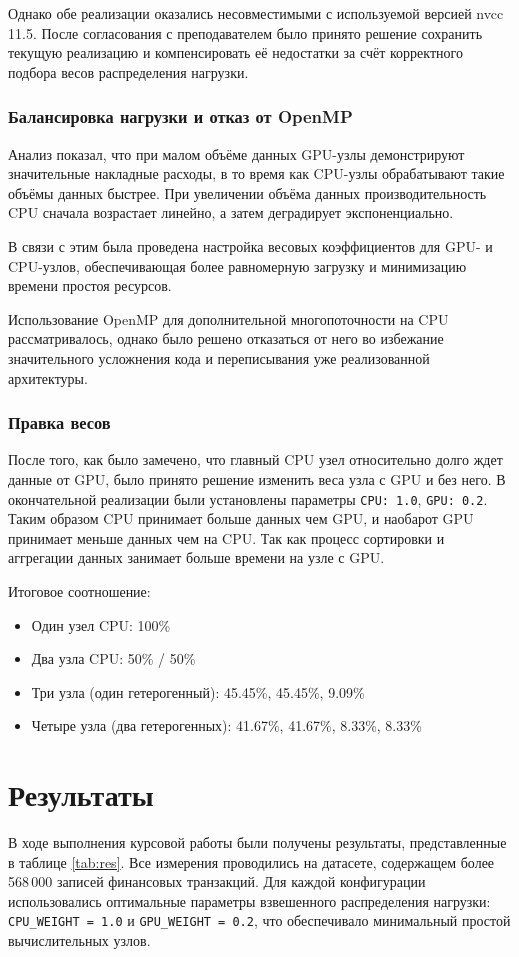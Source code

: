 \documentclass[areaset=advanced]{scrartcl}
\begin{document}
Однако обе реализации оказались несовместимыми с используемой версией nvcc 11.5.
После согласования с преподавателем было принято решение сохранить текущую
реализацию и компенсировать её недостатки за счёт корректного подбора весов
распределения нагрузки.

\subsubsection{Балансировка нагрузки и отказ от OpenMP}
Анализ показал, что при малом объёме данных GPU-узлы демонстрируют значительные
накладные расходы, в то время как CPU-узлы обрабатывают такие объёмы данных
быстрее. При увеличении объёма данных производительность CPU сначала возрастает
линейно, а затем деградирует экспоненциально.

В связи с этим была проведена настройка весовых коэффициентов для GPU- и CPU-узлов,
обеспечивающая более равномерную загрузку и минимизацию времени простоя ресурсов.

Использование OpenMP для дополнительной многопоточности на CPU рассматривалось,
однако было решено отказаться от него во избежание значительного усложнения кода
и переписывания уже реализованной архитектуры.

\subsubsection{Правка весов}

После того, как было замечено, что главный CPU узел относительно долго ждет данные от GPU, 
было принято решение изменить веса узла с GPU и без него. 
В окончательной реализации были установлены параметры \texttt{CPU: 1.0}, \texttt{GPU: 0.2}.
Таким образом CPU принимает больше данных чем GPU, и наобарот GPU принимает меньше данных чем на CPU. 
Так как процесс сортировки и аггрегации данных занимает больше времени на узле с GPU. 

Итоговое соотношение: 

\begin{itemize}
    \item Один узел CPU: 100\%
    \item Два узла CPU: 50\% / 50\%
    \item Три узла (один гетерогенный): 45.45\%, 45.45\%, 9.09\%
    \item Четыре узла (два гетерогенных): 41.67\%, 41.67\%, 8.33\%, 8.33\%
\end{itemize}

\newpage
\section{Результаты}
В ходе выполнения курсовой работы были получены результаты, представленные в таблице \ref{tab:res}. Все измерения проводились на датасете, содержащем более 568\,000 записей финансовых транзакций. Для каждой конфигурации использовались оптимальные параметры взвешенного распределения нагрузки: \texttt{CPU\_WEIGHT = 1.0} и \texttt{GPU\_WEIGHT = 0.2}, что обеспечивало минимальный простой вычислительных узлов.
\end{document}

